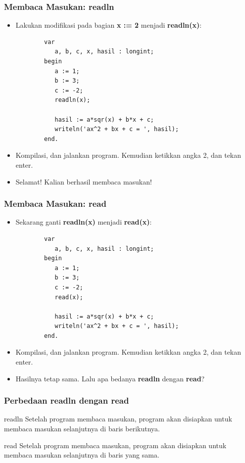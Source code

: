 \documentclass{beamer}
\begin{document}
\begin{frame}[fragile]
\frametitle{Membaca Masukan: readln}
\begin{itemize}
	\item Lakukan modifikasi pada bagian \textbf{x := 2} menjadi \textbf{readln(x)}:
	\begin{lstlisting}
		var
		   a, b, c, x, hasil : longint;
		begin
		   a := 1;
		   b := 3;
		   c := -2;
		   readln(x);
		
		   hasil := a*sqr(x) + b*x + c;
		   writeln('ax^2 + bx + c = ', hasil);
		end.
	\end{lstlisting}
	\item Kompilasi, dan jalankan program. Kemudian ketikkan angka 2, dan tekan enter.
	\item Selamat! Kalian berhasil membaca masukan!
\end{itemize}
\end{frame}

\begin{frame}[fragile]
\frametitle{Membaca Masukan: read}
\begin{itemize}
	\item Sekarang ganti \textbf{readln(x)} menjadi \textbf{read(x)}:
	\begin{lstlisting}
		var
		   a, b, c, x, hasil : longint;
		begin
		   a := 1;
		   b := 3;
		   c := -2;
		   read(x);
		
		   hasil := a*sqr(x) + b*x + c;
		   writeln('ax^2 + bx + c = ', hasil);
		end.
	\end{lstlisting}
	\item Kompilasi, dan jalankan program. Kemudian ketikkan angka 2, dan tekan enter.
	\item Hasilnya tetap sama. Lalu apa bedanya \textbf{readln} dengan \textbf{read}?
\end{itemize}
\end{frame}

\begin{frame}[fragile]
\frametitle{Perbedaan readln dengan read}
\begin{block}{readln}
	Setelah program membaca masukan, program akan disiapkan untuk membaca masukan selanjutnya di \alert{baris berikutnya}.
\end{block}
\begin{block}{read}
	Setelah program membaca masukan, program akan disiapkan untuk membaca masukan selanjutnya di \alert{baris yang sama}.
\end{block}
\end{frame}
\end{document}
